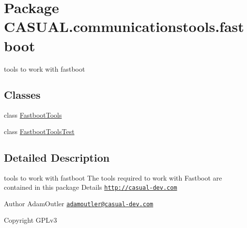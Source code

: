 \hypertarget{namespace_c_a_s_u_a_l_1_1communicationstools_1_1fastboot}{\section{Package C\-A\-S\-U\-A\-L.\-communicationstools.\-fastboot}
\label{namespace_c_a_s_u_a_l_1_1communicationstools_1_1fastboot}
}


tools to work with fastboot  


\subsection*{Classes}
\begin{DoxyCompactItemize}
\item 
class \hyperlink{class_c_a_s_u_a_l_1_1communicationstools_1_1fastboot_1_1_fastboot_tools}{Fastboot\-Tools}
\item 
class \hyperlink{class_c_a_s_u_a_l_1_1communicationstools_1_1fastboot_1_1_fastboot_tools_test}{Fastboot\-Tools\-Test}
\end{DoxyCompactItemize}


\subsection{Detailed Description}
tools to work with fastboot The tools required to work with Fastboot are contained in this package Details \href{http://casual-dev.com}{\tt http\-://casual-\/dev.\-com} \begin{DoxyAuthor}{Author}
Adam\-Outler \href{mailto:adamoutler@casual-dev.com}{\tt adamoutler@casual-\/dev.\-com} 
\end{DoxyAuthor}
\begin{DoxyCopyright}{Copyright}
G\-P\-Lv3 
\end{DoxyCopyright}
